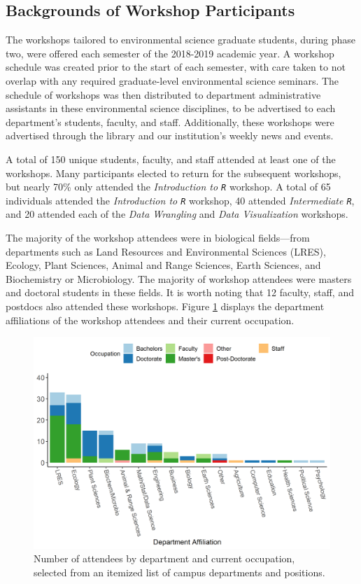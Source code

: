 \documentclass[12pt]{article}
\begin{document}
\subsection{Backgrounds of Workshop Participants}

\quad The workshops tailored to environmental science graduate students, during phase two, were offered each semester of the 2018-2019 academic year. A workshop schedule was created prior to the start of each semester, with care taken to not overlap with any required graduate-level environmental science seminars. The schedule of workshops was then distributed to department administrative assistants in these environmental science disciplines, to be advertised to each department's students, faculty, and staff. Additionally, these workshops were advertised through the library and our institution's weekly news and events. 

\quad A total of 150 unique students, faculty, and staff attended at least one of the workshops. Many participants elected to return for the subsequent workshops, but nearly 70\% only attended the \emph{Introduction to \texttt{R}} workshop. A total of 65 individuals attended the \emph{Introduction to \texttt{R}} workshop, 40 attended \emph{Intermediate \texttt{R}}, and 20 attended each of the \emph{Data Wrangling} and \emph{Data Visualization} workshops.    

\quad The majority of the workshop attendees were in biological fields---from departments such as Land Resources and Environmental Sciences (LRES), Ecology, Plant Sciences, Animal and Range Sciences, Earth Sciences, and Biochemistry or Microbiology. The majority of workshop attendees were masters and doctoral students in these fields. It is worth noting that 12 faculty, staff, and postdocs also attended these workshops. Figure \ref{fig:departments} displays the department affiliations of the workshop attendees and their current occupation. 

{
\begin{figure}[h!]
\centering
\includegraphics[width = \textwidth]{images/better_colors_attendance.png}
\caption{Number of attendees by department and current occupation, selected from an itemized list of campus departments and positions.}
    \label{fig:departments}
\end{figure}
}
\end{document}
